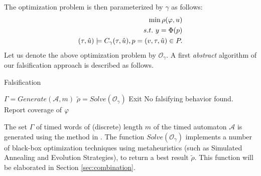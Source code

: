 The optimization problem is then parameterized by $\gamma$ as follows:
\begin{eqnarray} \label{eq:optim2}
\min \rho(\varphi, u) \\ \nonumber
s.t. ~y=\Phi(p) \\ \nonumber
(\tau, \hat{u}) \models C_{\gamma}(\tau, \hat{u}), p = (v, \tau, \hat{u}) \in P . \nonumber
\end{eqnarray}
Let us denote the above optimization problem by $\mathcal{O}_{\gamma}$. A first {\em abstract} algorithm of our falsification approach is described as follows.
\begin{algorithm}
\caption{Falsification}
\begin{algorithmic}
		\State $\Gamma = Generate(\mathcal{A},m)$
	        \ForAll{$\gamma \in \Gamma$} 
		\State $\tilde{\rho} = Solve(\mathcal{O}_{\gamma})$
		  \State Exit	
		\EndIf
		\EndFor
		\State No falsifying behavior found. Report coverage of $\varphi$
\end{algorithmic}
\end{algorithm}
The set $\Gamma$ of timed words of (discrete) length $m$ of the timed automaton $\mathcal{A}$ is generated using the method in \cite{Cosmos}. The function $Solve(\mathcal{O}_{\gamma})$ implements a number of black-box optimization techniques using metaheuristics (such as Simulated Annealing and Evolution Strategies), to return a best result $\tilde{\rho}$. This function will be elaborated in Section \ref{sec:combination}.



